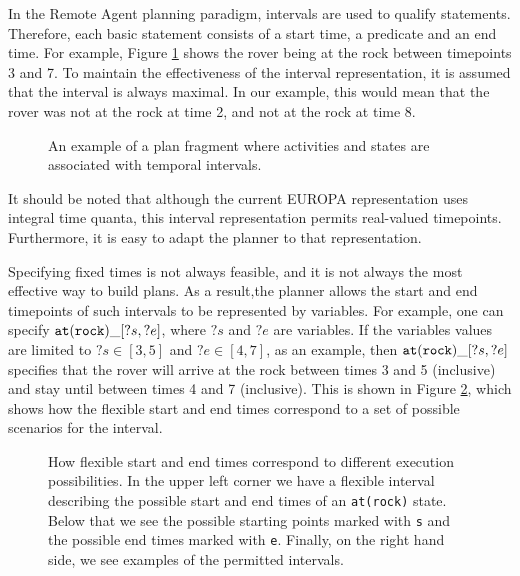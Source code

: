 In the Remote Agent planning paradigm, intervals are used to qualify
statements.  Therefore, each basic statement consists of a start time,
a predicate and an end time.  For example, Figure
\ref{intervalTimepointPic} shows the rover being at the rock between
timepoints 3 and 7.  To maintain the effectiveness of the interval
representation, it is assumed that the interval is always maximal.  In
our example, this would mean that the rover was not at the rock at
time 2, and not at the rock at time 8.


\begin{figure}[btph]
\centerline{
}
\caption{\label{intervalTimepointPic} An example of a plan fragment where activities and 
states are associated with temporal intervals.}
\end{figure}

It should be noted that although the current EUROPA representation 
uses integral time quanta, this interval representation permits 
real-valued timepoints.  Furthermore, it is easy to adapt the planner 
to that representation.

Specifying fixed times is not always feasible, and it is not always
the most effective way to build plans.  As a result,the planner allows
the start and end timepoints of such intervals to be represented by
variables.  For example, one can specify ${\tt at(rock)}\_{[?s,?e]}$,
where $?s$ and $?e$ are variables.  If the variables values are
limited to $?s \in [3,5]$ and $?e \in [4,7]$, as an example, then
${\tt at(rock)}\_{[?s,?e]}$ specifies that the rover will arrive at
the rock between times 3 and 5 (inclusive) and stay until between
times 4 and 7 (inclusive).  This is shown in Figure \ref{flexTime},
which shows how the flexible start and end times correspond to a set
of possible scenarios for the interval.


\begin{figure}[btph]
\centerline{ }
\caption{\label{flexTime} How flexible start and end times correspond
to different execution possibilities.  In the upper left corner we 
have a flexible interval describing the possible start and end times 
of an {\tt at(rock)} state.  Below that we see the possible starting 
points marked with {\tt s} and the possible end times marked with 
{\tt e}.  Finally, on the right hand side, we see examples of the 
permitted intervals.}
\end{figure}

